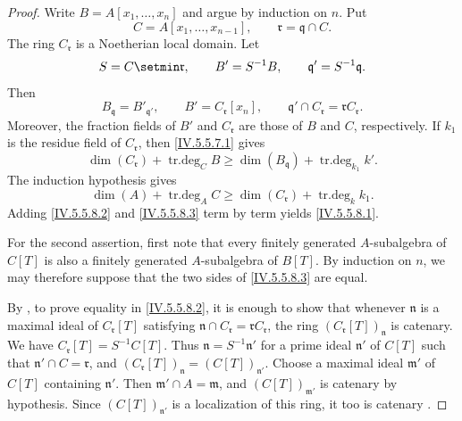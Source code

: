 \begin{proof}

Write $B=A[x_1,\ldots,x_n]$
and argue by induction on $n$.
Put
\[
C=A[x_1,\ldots,x_{n-1}],
\qquad
\mathfrak r=\mathfrak q\cap C.
\]
The ring $C_{\mathfrak r}$ is a Noetherian local domain.
Let
\[
S=C\setmin\mathfrak r,\qquad
B'=S^{-1}B,\qquad
\mathfrak q'=S^{-1}\mathfrak q.
\]
Then
\[
B_{\mathfrak q}=B'_{\mathfrak q'},
\qquad
B'=C_{\mathfrak r}[x_n],
\qquad
\mathfrak q'\cap C_{\mathfrak r}
  =\mathfrak rC_{\mathfrak r}.
\]
Moreover, the fraction fields of $B'$ and $C_{\mathfrak r}$ are
those of $B$ and $C$, respectively.
If $k_1$ is the residue field of $C_{\mathfrak r}$, then
\eqref{IV.5.5.7.1} gives
\begin{equation}
\dim(C_{\mathfrak r})+\operatorname{tr.deg}_C B
 \geq\dim(B_{\mathfrak q})+\operatorname{tr.deg}_{k_1}k'.
\tag{5.5.8.2}\label{IV.5.5.8.2}
\end{equation}
The induction hypothesis gives
\begin{equation}
\dim(A)+\operatorname{tr.deg}_A C
 \geq\dim(C_{\mathfrak r})+\operatorname{tr.deg}_k k_1.
\tag{5.5.8.3}\label{IV.5.5.8.3}
\end{equation}
Adding \eqref{IV.5.5.8.2} and \eqref{IV.5.5.8.3} term by term yields
\eqref{IV.5.5.8.1}.

For the second assertion, first note that every finitely generated
$A$-subalgebra of $C[T]$ is also a finitely generated
$A$-subalgebra of $B[T]$.
By induction on $n$, we may therefore suppose that the two sides of
\eqref{IV.5.5.8.3} are equal.

By , to prove equality in
\eqref{IV.5.5.8.2}, it is enough to show that whenever
$\mathfrak n$ is a maximal ideal of $C_{\mathfrak r}[T]$ satisfying $\mathfrak n\cap C_{\mathfrak r}
=\mathfrak rC_{\mathfrak r}$,
the ring $(C_{\mathfrak r}[T])_{\mathfrak n}$ is catenary.
We have $C_{\mathfrak r}[T]=S^{-1}C[T]$.
Thus $\mathfrak n=S^{-1}\mathfrak n'$ for a prime ideal
$\mathfrak n'$ of $C[T]$ such that
$\mathfrak n'\cap C=\mathfrak r$, and $(C_{\mathfrak r}[T])_{\mathfrak n}
=(C[T])_{\mathfrak n'}$.
Choose a maximal ideal $\mathfrak m'$ of $C[T]$ containing
$\mathfrak n'$.
Then $\mathfrak m'\cap A=\mathfrak m$, and
$(C[T])_{\mathfrak m'}$ is catenary by hypothesis.
Since $(C[T])_{\mathfrak n'}$ is a localization of this ring, it too
is catenary .
\end{proof}
